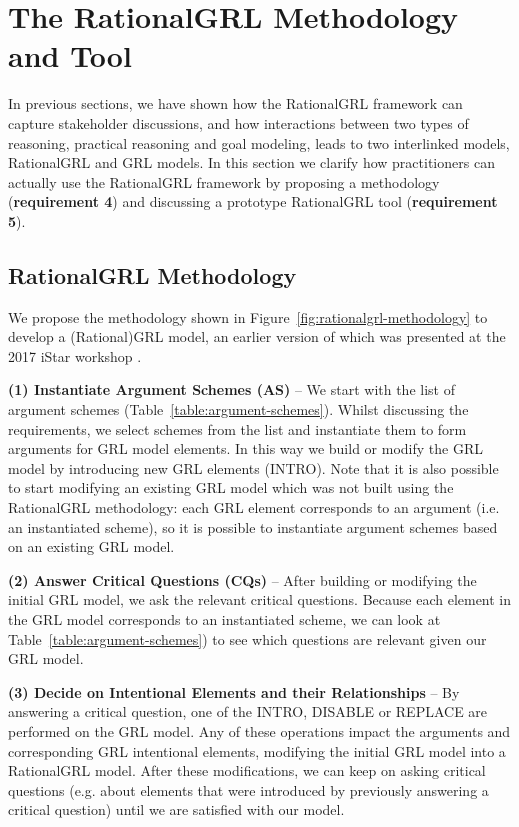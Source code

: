 \section{The RationalGRL Methodology and Tool}
\label{sect:methodology}

In previous sections, we have shown how the RationalGRL framework can capture stakeholder discussions, and how interactions between two types of reasoning, practical reasoning and goal modeling, leads to two interlinked models, RationalGRL and GRL models. In this section we clarify how practitioners can actually use the RationalGRL framework by proposing a methodology (\textbf{requirement 4}) and discussing a prototype RationalGRL tool (\textbf{requirement 5}).

\subsection{RationalGRL Methodology}
\label{sect:methodology} 

We propose the methodology shown in Figure~\ref{fig:rationalgrl-methodology} to develop a (Rational)GRL model, an earlier version of which was presented at the 2017 iStar workshop \cite{ghanavatiMethodology}. %

\textbf{(1) Instantiate Argument Schemes (AS)} -- We start with the list of argument schemes (Table~\ref{table:argument-schemes}). Whilst discussing the requirements, we select schemes from the list and instantiate them to form arguments for GRL model elements. In this way we build or modify the GRL model by introducing new GRL elements (\textsf{INTRO}). Note that it is also possible to start modifying an existing GRL model which was not built using the RationalGRL methodology: each GRL element corresponds to an argument (i.e. an instantiated scheme), so it is possible to instantiate argument schemes based on an existing GRL model. 

\textbf{(2) Answer Critical Questions (CQs)} -- After building or modifying the initial GRL model, we ask the relevant critical questions. Because each element in the GRL model corresponds to an instantiated scheme, we can look at Table~\ref{table:argument-schemes}) to see which questions are relevant given our GRL model. 

\textbf{(3) Decide on Intentional Elements and their Relationships} -- By answering a critical question, one of the \textsf{INTRO}, \textsf{DISABLE} or \textsf{REPLACE} are performed on the GRL model. Any of these operations impact the arguments and corresponding GRL intentional elements, modifying the initial GRL model into a RationalGRL model. After these modifications, we can keep on asking critical questions (e.g. about elements that were introduced by previously answering a critical question) until we are satisfied with our model.   

